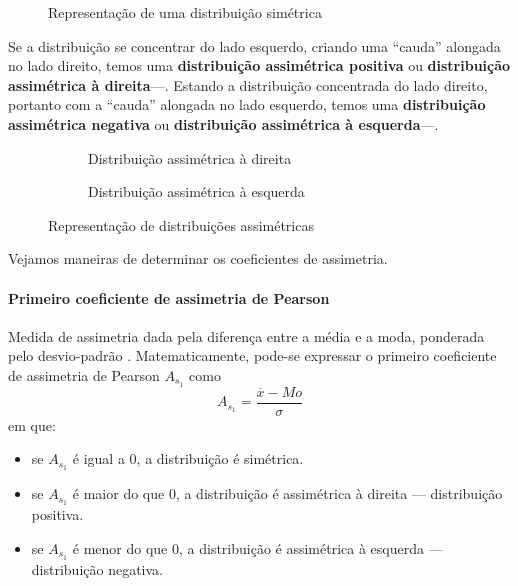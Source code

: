 \begin{figure}[htpb]
    \centering
    
    \caption{Representação de uma distribuição simétrica}
    \label{fig:dist-simetrica}
\end{figure}

Se a distribuição se concentrar do lado esquerdo, criando uma ``cauda''
alongada no lado direito, temos uma \textbf{distribuição assimétrica positiva}
ou \textbf{distribuição assimétrica à direita}---.
Estando a distribuição concentrada do lado direito, portanto com a ``cauda''
alongada no lado esquerdo, temos uma \textbf{distribuição assimétrica negativa}
ou \textbf{distribuição assimétrica à esquerda}---.

\begin{figure}[ht!]
    \centering
    \begin{subfigure}{0.48\textwidth}
        \centering
        
        \caption{Distribuição assimétrica à direita}
        \label{fig:dist-direita}
    \end{subfigure}
    \hfill
    \begin{subfigure}{0.48\textwidth}
        \centering
        
        \caption{Distribuição assimétrica à esquerda}
        \label{fig:dist-esquerda}
    \end{subfigure}
    \caption{Representação de distribuições assimétricas}
    \label{fig:dist-assimetrica}
\end{figure}

Vejamos maneiras de determinar os coeficientes de assimetria.

\paragraph{Primeiro coeficiente de assimetria de Pearson}
Medida de assimetria dada pela diferença entre a média e a moda, ponderada pelo
desvio-padrão \parencite[p.~161]{favero}. Matematicamente, pode-se expressar o
primeiro coeficiente de assimetria de Pearson $A_{s_1}$ como
\begin{equation}
    A_{s_1} = \frac{\overline{x} - Mo}{\sigma}
    \label{eq:prim-coef-ass-pearson}
\end{equation}
em que:
\begin{itemize}
    \item se $A_{s_1}$ é igual a $0$, a distribuição é simétrica.
    \item se $A_{s_1}$ é maior do que $0$, a distribuição é assimétrica à
    direita --- distribuição positiva.
    \item se $A_{s_1}$ é menor do que $0$, a distribuição é assimétrica à
    esquerda --- distribuição negativa.
\end{itemize}

